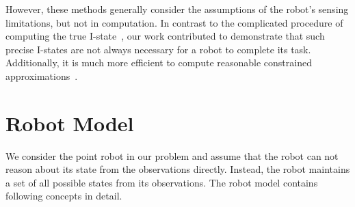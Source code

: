 However, these methods generally consider the assumptions of the robot's sensing limitations, 
but not in computation. 
%
In contrast to the complicated procedure of computing the true I-state~\cite{TovLav08, YuLav10}, 
our work contributed to demonstrate that such precise I-states are not always necessary for a robot to complete its task.
Additionally, it is much more efficient to compute reasonable constrained approximations~\cite{SonOka12}.

\section{Robot Model}
\label{sec:robot-mod}
We consider the point robot in our problem and assume that the robot can not reason about
its state from the observations directly. 
%
Instead, the robot maintains a set of all possible states from its observations. 
%
The robot model contains following concepts in detail.
